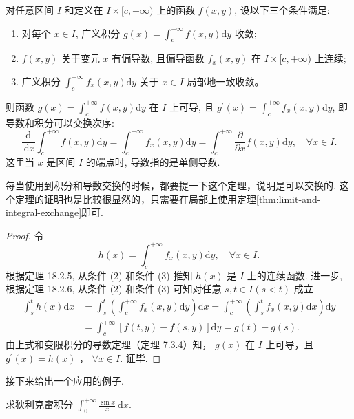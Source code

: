 \begin{theorem}[导数和积分交换次序]\label{thm:derivative-and-integral-exchange}
    对任意区间 $I$ 和定义在 $I \times[c,+\infty)$ 上的函数 $f(x, y)$, 设以下三个条件满足:
    \begin{enumerate}
        \item 对每个 $x \in I$, 广义积分 $g(x)=\int_c^{+\infty} f(x, y) \mathrm{d} y$ 收敛;
        \item $f(x, y)$ 关于变元 $x$ 有偏导数, 且偏导函数 $f_x(x, y)$ 在 $I \times[c,+\infty)$ 上连续;
        \item 广义积分 $\int_c^{+\infty} f_x(x, y) \mathrm{d} y$ 关于 $x \in I$ 局部地一致收敛。
    \end{enumerate}
    则函数 $g(x)=\int_c^{+\infty} f(x, y) \mathrm{d} y$ 在 $I$ 上可导, 且 $g^{\prime}(x)=\int_c^{+\infty} f_x(x, y) \mathrm{d} y$, 即导数和积分可以交换次序:
    \[
    \frac{\mathrm{d}}{\mathrm{~d} x} \int_c^{+\infty} f(x, y) \mathrm{d} y=\int_c^{+\infty} f_x(x, y) \mathrm{d} y=\int_c^{+\infty} \frac{\partial}{\partial x} f(x, y) \mathrm{d} y, \quad \forall x \in I .
    \]
    这里当 $x$ 是区间 $I$ 的端点时, 导数指的是单侧导数.
\end{theorem}
\begin{note}
    每当使用到积分和导数交换的时候，都要提一下这个定理，说明是可以交换的. 这个定理的证明也是比较很显然的，只需要在局部上使用定理\ref{thm:limit-and-integral-exchange}即可.
\end{note}
\begin{proof}
    令
    \[
    h(x)=\int_c^{+\infty} f_x(x, y) \mathrm{d} y, \quad \forall x \in I .
    \]
    根据定理 18.2.5, 从条件 (2) 和条件 (3) 推知 $h(x)$ 是 $I$ 上的连续函数. 进一步, 根据定理 18.2.6, 从条件 (2) 和条件 (3) 可知对任意 $s, t \in I(s<t)$ 成立
    \begin{align*}
        \int_s^t h(x) \mathrm{d} x & =\int_s^t\left(\int_c^{+\infty} f_x(x, y) \mathrm{d} y\right) \mathrm{d} x=\int_c^{+\infty}\left(\int_s^t f_x(x, y) \mathrm{d} x\right) \mathrm{d} y \\
    & =\int_c^{+\infty}[f(t, y)-f(s, y)] \mathrm{d} y=g(t)-g(s) .
    \end{align*}
    由上式和变限积分的导数定理（定理 7.3.4）知， $g(x)$ 在 $I$ 上可导，且 $g^{\prime}(x)=h(x)$ ， $\forall x \in I$. 证毕.
\end{proof}
接下来给出一个应用的例子.
\begin{example}
    求狄利克雷积分 $\int_0^{+\infty} \frac{\sin x}{x} \mathrm{~d} x$.
\end{example}
